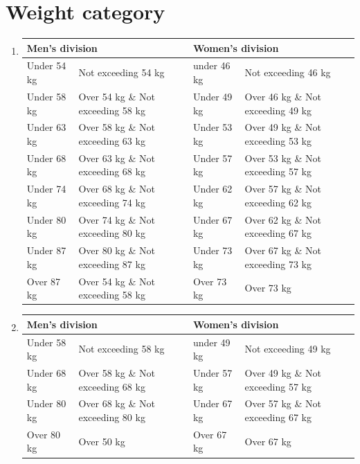 \documentclass[draft]{report}
\begin{document}
\chapter{Weight category}\label{weight-category}

\begin{enumerate}

\item


\begin{center}
\begin{tabular}{ |l|l|l|l| } 
 \hline
 \multicolumn{2}{|l|}{Men's division} & \multicolumn{2}{|l|}{Women's division}  \\
 \hline
 Under 54 kg & Not exceeding 54 kg & under 46 kg & Not exceeding 46 kg \\
 \hline
 Under 58 kg & Over 54 kg \& Not exceeding 58 kg & Under 49 kg & Over 46 kg \& Not exceeding 49 kg \\
 \hline
 Under 63 kg & Over 58 kg \& Not exceeding 63 kg & Under 53 kg & Over 49 kg \& Not exceeding 53 kg \\
 \hline
 Under 68 kg & Over 63 kg \& Not exceeding 68 kg & Under 57 kg & Over 53 kg \& Not exceeding 57 kg \\
 \hline
 Under 74 kg & Over 68 kg \& Not exceeding 74 kg & Under 62 kg & Over 57 kg \& Not exceeding 62 kg \\
 \hline
 Under 80 kg & Over 74 kg \& Not exceeding 80 kg & Under 67 kg & Over 62 kg \& Not exceeding 67 kg \\
 \hline
 Under 87 kg & Over 80 kg \& Not exceeding 87 kg & Under 73 kg & Over 67 kg \& Not exceeding 73 kg \\
 \hline
 Over 87 kg & Over 54 kg \& Not exceeding 58 kg & Over 73 kg & Over 73 kg \\
 \hline
\end{tabular}
\end{center}

\item


\begin{center}
\begin{tabular}{ |l|l|l|l| } 
 \hline
 \multicolumn{2}{|l|}{Men's division} & \multicolumn{2}{|l|}{Women's division}  \\
 \hline
 Under 58 kg & Not exceeding 58 kg & under 49 kg & Not exceeding 49 kg \\
 \hline
 Under 68 kg & Over 58 kg \& Not exceeding 68 kg & Under 57 kg & Over 49 kg \& Not exceeding 57 kg \\
 \hline
 Under 80 kg & Over 68 kg \& Not exceeding 80 kg & Under 67 kg & Over 57 kg \& Not exceeding 67 kg \\
 \hline
 Over 80 kg & Over 50 kg & Over 67 kg & Over 67 kg \\
 \hline
\end{tabular}
\end{center}


\end{enumerate}
\end{document}
